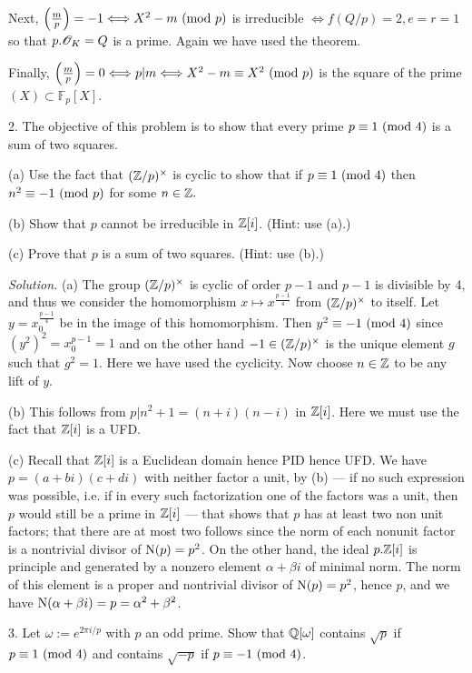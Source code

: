 \documentclass[10pt,a4paper,reqno]{amsart}
\begin{document}
Next, $\left( \frac{m}{p} \right) = -1 \Longleftrightarrow X^2-m \text{ } (\mathrm{mod}\text{ } p)$ is
irreducible $\Longleftrightarrow f(Q/p) = 2, e = r = 1$ so that $p.\mathscr{O}_K = Q$ is
a prime. Again we have used the theorem.

Finally, $\left( \frac{m}{p} \right) = 0 \Longleftrightarrow p|m
\Longleftrightarrow X^2-m \equiv X^2 \text{ } (\mathrm{mod}\text{ } p)$ is the square of the prime $(X)
\subset \mathbb{F}_p[X]$.

\bigskip

2. The objective of this problem is to show that every prime $p\equiv 1
\text{ } (\mathrm{mod}\text{ } 4)$ is a sum of two squares.

(a) Use the fact that $(\mathbb{Z}/p)^\times$ is cyclic to show that if $p\equiv 1
\text{ } (\mathrm{mod}\text{ } 4)$ then $n^2 \equiv -1 \text{ } (\mathrm{mod}\text{ } p)$ for some $n\in \mathbb{Z}.$

(b) Show that $p$ cannot be irreducible in $\mathbb{Z}[i]$. (Hint: use (a).)

(c) Prove that $p$ is a sum of two squares. (Hint: use (b).)

\bigskip

\textit{Solution.} (a) The group $(\mathbb{Z}/p)^\times$ is cyclic of order $p-1$ and
$p-1$ is divisible by 4, and thus we consider the homomorphism $x\mapsto
x^\frac{p-1}{4}$ from $(\mathbb{Z}/p)^\times$ to itself. Let $y = x_0^{\frac{p-1}{4}}$
be in the image of this homomorphism. Then $y^2 \equiv -1 \text{ } (\mathrm{mod}\text{ } 4)$ since
$(y^{2})^{2} = x_0^{p-1} = 1$ and on the other hand $-1 \in (\mathbb{Z}/p)^\times$ is
the unique element $g$ such that $g^2 = 1$. Here we have used the cyclicity.
Now choose $n\in\mathbb{Z}$ to be any lift of $y$.

(b) This follows from $p | n^2 + 1 = (n+i)(n-i)$ in $\mathbb{Z}[i]$. Here we must use
the fact that $\mathbb{Z}[i]$ is a UFD.

(c) Recall that $\mathbb{Z}[i]$ is a Euclidean domain hence PID hence UFD. We have $p =
(a+bi)(c+di)$ with neither factor a unit, by (b) --- if no such expression was
possible, i.e. if in every such factorization one of the factors was a unit,
then $p$ would still be a prime in $\mathbb{Z}[i]$ --- that shows that $p$ has at least
two non unit factors; that there are at most two follows since the norm of each
nonunit factor is a nontrivial divisor of $\mathrm{N}(p) = p^2$. On the other hand,
the ideal $p.\mathbb{Z}[i]$ is principle and generated by a nonzero element
$\alpha+\beta i$ of minimal norm. The norm of this element is a proper and
nontrivial divisor of $\mathrm{N}(p) = p^2$, hence $p$, and we have $\mathrm{N}(\alpha+\beta
i) = p = \alpha^2 + \beta^2$.

\bigskip

3. Let $\omega := e^{2\pi i/p}$ with $p$ an odd prime. Show that $\mathbb{Q}[\omega]$
contains $\sqrt{p}$ if $p\equiv 1 \text{ } (\mathrm{mod}\text{ } 4)$ and contains $\sqrt{-p}$ if
$p\equiv -1 \text{ } (\mathrm{mod}\text{ } 4)$.
\end{document}
